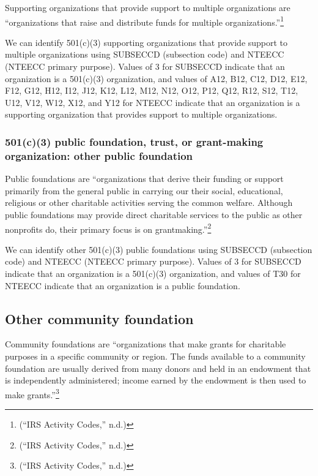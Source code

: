 \documentclass[
  letterpaper,
  DIV=11,
  numbers=noendperiod]{scrreprt}
\begin{document}
Supporting organizations that provide support to multiple organizations
are ``organizations that raise and distribute funds for multiple
organizations.''\footnote{({``IRS Activity Codes,''} n.d.)}

We can identify 501(c)(3) supporting organizations that provide support
to multiple organizations using SUBSECCD (subsection code) and NTEECC
(NTEECC primary purpose). Values of 3 for SUBSECCD indicate that an
organization is a 501(c)(3) organization, and values of A12, B12, C12,
D12, E12, F12, G12, H12, I12, J12, K12, L12, M12, N12, O12, P12, Q12,
R12, S12, T12, U12, V12, W12, X12, and Y12 for NTEECC indicate that an
organization is a supporting organization that provides support to
multiple organizations.

\hypertarget{c3-public-foundation-trust-or-grant-making-organization-other-public-foundation}{%
\subsubsection{501(c)(3) public foundation, trust, or grant-making
organization: other public
foundation}\label{c3-public-foundation-trust-or-grant-making-organization-other-public-foundation}}

Public foundations are ``organizations that derive their funding or
support primarily from the general public in carrying our their social,
educational, religious or other charitable activities serving the common
welfare. Although public foundations may provide direct charitable
services to the public as other nonprofits do, their primary focus is on
grantmaking.''\footnote{({``IRS Activity Codes,''} n.d.)}

We can identify other 501(c)(3) public foundations using SUBSECCD
(subsection code) and NTEECC (NTEECC primary purpose). Values of 3 for
SUBSECCD indicate that an organization is a 501(c)(3) organization, and
values of T30 for NTEECC indicate that an organization is a public
foundation.

\hypertarget{other-community-foundation}{%
\subsection{Other community
foundation}\label{other-community-foundation}}

Community foundations are ``organizations that make grants for
charitable purposes in a specific community or region. The funds
available to a community foundation are usually derived from many donors
and held in an endowment that is independently administered; income
earned by the endowment is then used to make grants.''\footnote{({``IRS
  Activity Codes,''} n.d.)}
\end{document}
